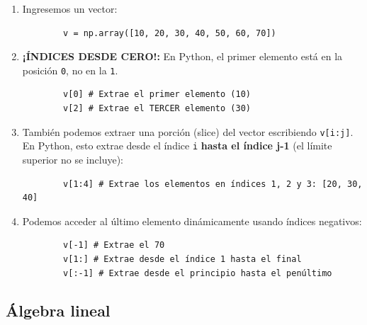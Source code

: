 \documentclass[11pt,a4paper,openany]{book}
\begin{document}
\begin{enumerate}
	\item Ingresemos un vector:
	\begin{verbatim}
		v = np.array([10, 20, 30, 40, 50, 60, 70])
	\end{verbatim}
	
	\item \textbf{¡ÍNDICES DESDE CERO!:} En Python, el primer elemento está en la posición \texttt{0}, no en la \texttt{1}.
	\begin{verbatim}
		v[0] # Extrae el primer elemento (10)
		v[2] # Extrae el TERCER elemento (30)
	\end{verbatim}
	
	\item También podemos extraer una porción (slice) del vector escribiendo \verb-v[i:j]-. En Python, esto extrae desde el índice \texttt{i} \textbf{hasta el índice j-1} (el límite superior no se incluye):
	\begin{verbatim}
		v[1:4] # Extrae los elementos en índices 1, 2 y 3: [20, 30, 40]
	\end{verbatim}
	
	\item Podemos acceder al último elemento dinámicamente usando índices negativos:
	\begin{verbatim}
		v[-1] # Extrae el 70
		v[1:] # Extrae desde el índice 1 hasta el final
		v[:-1] # Extrae desde el principio hasta el penúltimo
	\end{verbatim}
\end{enumerate}

\subsection{Álgebra lineal}
\end{document}
